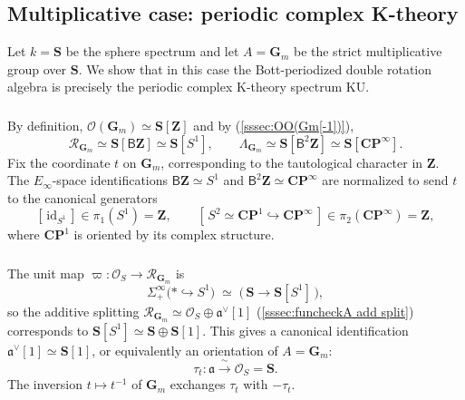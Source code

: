 \documentclass[12pt, oneside]{amsart}
\numberwithin{equation}{section}
\theoremstyle{remark}
\theoremstyle{plain}
\newcommand{\R}{\mathcal{R}}
\newcommand{\fra}{\mathfrak{a}}
\newcommand{\frav}{\mathfrak{a}^\vee}
\newcommand{\lam}{\Lambda}
\newcommand{\OO}{\mathcal{O}}
\newcommand{\GGm}{\mathbf{G}_{m}}
\newcommand{\bZ}{\mathbf{Z}}
\begin{document}
\subsection{Multiplicative case: periodic complex K-theory}\label{ssec:KU}

Let $k = \mathbf{S}$ be the sphere spectrum and let $A = \GGm$ be the strict multiplicative group over $\mathbf{S}$.
We show that in this case the Bott-periodized double rotation algebra is precisely the periodic complex K-theory spectrum $\mathrm{KU}$.

\subsubsection{}

By definition, $\OO(\GGm) \simeq \mathbf{S}[\mathbf{Z}]$ and by (\ref{sssec:OO(Gm[-1])}),
$$
\R_{\GGm} \simeq \mathbf S[\mathsf{B}\bZ] \simeq \mathbf S[S^1], \qquad
\lam_{\GGm} \simeq \mathbf S[\mathsf{B}^2\bZ] \simeq \mathbf S[\mathbf{CP}^\infty].
$$
Fix the coordinate $t$ on $\GGm$, corresponding to the tautological character in $\bZ$.
The $E_\infty$-space identifications $\mathsf{B}\bZ \simeq S^1$ and $\mathsf{B}^2\bZ \simeq \mathbf{CP}^\infty$ are normalized to send $t$ to the canonical generators
$$
  [\,\mathrm{id}_{S^1}\,] \in \pi_1(S^1) = \bZ,
  \qquad
  [\,S^2 \simeq \mathbf{C}\mathbf{P}^1 \hookrightarrow \mathbf{C}\mathbf{P}^\infty\,] \in \pi_2(\mathbf{C}\mathbf{P}^\infty) = \bZ,
$$
where $\mathbf{C}\mathbf{P}^1$ is oriented by its complex structure.

\subsubsection{}\label{sssec:tau t}

The unit map $\varpi : \OO_S \to \R_{\GGm}$ is
$$\Sigma^\infty_+\bigl( * \hookrightarrow S^1 \bigr) \;\simeq\; \bigl( \,\mathbf{S} \to \mathbf{S}[S^1] \,\bigr),$$
so the additive splitting $\R_{\GGm} \simeq \OO_S \oplus \frav[1]$ (\ref{sssec:funcheckA add split}) corresponds to $\mathbf{S}[S^1] \simeq \mathbf{S} \oplus \mathbf{S}[1]$.
This gives a canonical identification $\frav[1] \simeq \mathbf{S}[1]$, or equivalently an orientation of $A=\GGm$:
\begin{equation}\label{eq:tau t}
  \tau_t : \fra \xrightarrow{\ \sim\ } \OO_S = \mathbf{S}.
\end{equation}
The inversion $t \mapsto t^{-1}$ of $\GGm$ exchanges $\tau_t$ with $-\tau_t$.

\subsubsection{}
\end{document}
